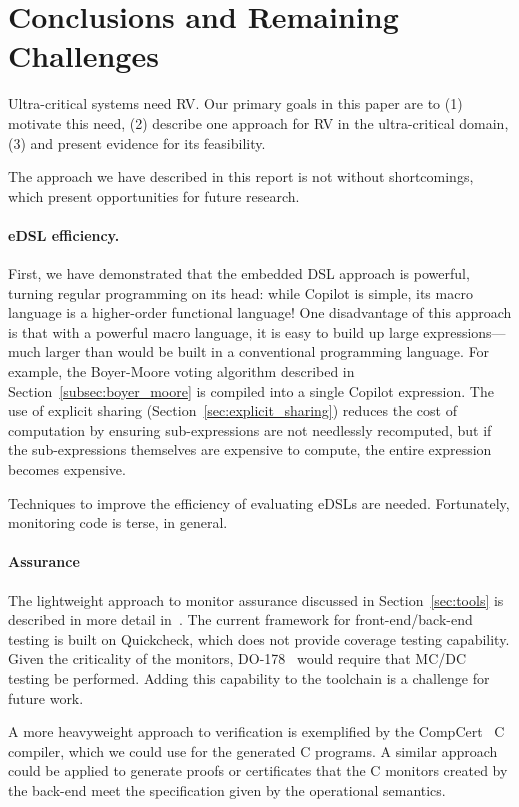 \section{Conclusions and Remaining Challenges}
\label{sec:conclusions}
Ultra-critical systems need RV.  Our primary goals in this paper are to (1)
motivate this need, (2) describe one approach for RV in the ultra-critical
domain, (3) and present evidence for its feasibility.

The approach we have described in this report is not without shortcomings, which
present opportunities for future research.

\paragraph{eDSL efficiency.}
First, we have demonstrated that the embedded DSL approach is powerful,
turning regular programming on its head: while Copilot is simple, its
macro language is a higher-order functional language!  One disadvantage of this
approach is that with a powerful macro language, it is easy to
build up large expressions---much larger than would be built in a
conventional programming language.  For example, the Boyer-Moore
voting algorithm described in Section~\ref{subsec:boyer_moore} is compiled into
a single Copilot expression.  The use of explicit sharing
(Section~\ref{sec:explicit_sharing}) reduces the cost of computation by ensuring
sub-expressions are not needlessly recomputed, but if the sub-expressions
themselves are expensive to compute, the entire expression becomes expensive.

Techniques to improve the efficiency of evaluating eDSLs are needed.
Fortunately, monitoring code is terse, in general.  

\paragraph{Assurance}
The lightweight approach to monitor assurance discussed  in
Section~\ref{sec:tools}  is described in more detail
in~\cite{PikeWNG2012}.  The current framework for front-end/back-end
testing is built on Quickcheck, which does not provide coverage
testing capability.  Given the  criticality  of the
monitors, DO-178~\cite{DO178B} would require that MC/DC testing be
performed. Adding this capability to the toolchain is a challenge for
future work.  

  A more heavyweight approach to verification is exemplified by the
  CompCert~\cite{leroy} C compiler, which we could use for the
  generated C programs.  A similar approach could be applied to
  generate proofs or certificates that the C monitors created by the
  back-end meet the specification given by the operational
  semantics. 

